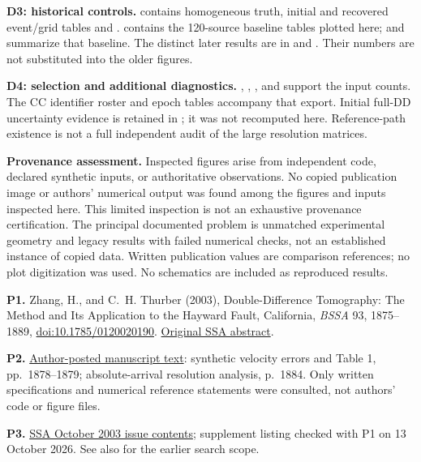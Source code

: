 \documentclass[10pt,letterpaper]{article}
\begin{document}
\textbf{D3: historical controls.}
 contains homogeneous truth, initial and recovered
event/grid tables and .
 contains the 120-source baseline tables plotted here;
 and  summarize that baseline.
The distinct later results are in
and .
Their numbers are not substituted into the older figures.

\textbf{D4: selection and additional diagnostics.}
, ,
, and 
support the input counts. The CC identifier roster and epoch tables accompany
that export. Initial full-DD uncertainty evidence is retained in
; it was not
recomputed here. Reference-path existence is not a full independent audit of
the large resolution matrices.

\textbf{Provenance assessment.}
Inspected figures arise from independent code, declared synthetic inputs, or
authoritative observations. No copied publication image or authors' numerical
output was found among the figures and inputs inspected here. This limited
inspection is not an exhaustive provenance certification. The principal
documented problem is unmatched experimental geometry and legacy results with
failed numerical checks, not an established instance of copied data. Written
publication values are comparison references; no plot digitization was used.
No schematics are included as reproduced results.

\textbf{P1.} Zhang, H., and C.~H. Thurber (2003), Double-Difference Tomography:
The Method and Its Application to the Hayward Fault, California,
\emph{BSSA} 93, 1875--1889,
\href{https://doi.org/10.1785/0120020190}{doi:10.1785/0120020190}.
\href{https://www.seismosoc.org/Publications/BSSA_html/bssa_93-5/02190.html}{Original SSA abstract}.

\textbf{P2.} \href{https://www.researchgate.net/publication/215754286_Double-Difference_Tomography_The_Method_and_Its_Application_to_the_Hayward_Fault_California}{Author-posted manuscript text}:
synthetic velocity errors and Table 1, pp.\ 1878--1879; absolute-arrival
resolution analysis, p.\ 1884. Only written specifications and numerical
reference statements were consulted, not authors' code or figure files.

\textbf{P3.} \href{https://www.seismosoc.org/Publications/BSSA_html/bssa_93-5/ssa_toc_93-5.html}{SSA October 2003 issue contents};
supplement listing checked with P1 on 13 October 2026.
See also  for the earlier search scope.
\end{document}
